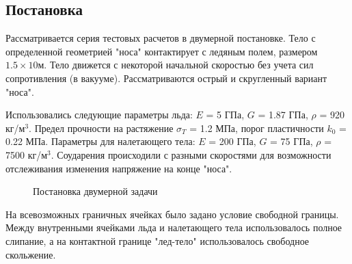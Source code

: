 \documentclass[12pt,a4paper, titlepage, openany]{book}
\begin{document}
\subsection*{Постановка}
\par
Рассматривается серия тестовых расчетов в двумерной постановке. Тело с определенной геометрией "носа" контактирует с ледяным полем, размером $1.5 \times 10$м. Тело движется с некоторой начальной скоростью без учета сил сопротивления (в вакууме). Рассматриваются острый и скругленный вариант "носа".
\par
Использовались следующие параметры льда: $E$ = 5 ГПа, $G$ = 1.87 ГПа, $\rho$ = 920 кг/м$^3$. Предел прочности на растяжение $\sigma_T$ = 1.2 МПа, порог пластичности $k_0$ = 0.22 МПа. Параметры для налетающего тела: $E$ = 200 ГПа, $G$ = 75 ГПа, $\rho$ = 7500 кг/м$^3$. Соударения происходили с разными скоростями для возможности отслеживания изменения напряжение на конце "носа". 
\begin{figure}[h]
\begin{minipage}[h]{0.5\linewidth}
\end{minipage}
\hfill
\begin{minipage}[h]{0.5\linewidth}
\end{minipage}
\caption{Постановка двумерной задачи}
\label{ris:image1}
\end{figure}
\par
На всевозможных граничных ячейках было задано условие свободной границы. Между внутренными ячейками льда и налетающего тела использовалось полное слипание, а на контактной границе "лед-тело" использовалось свободное скольжение. 
\end{document}
